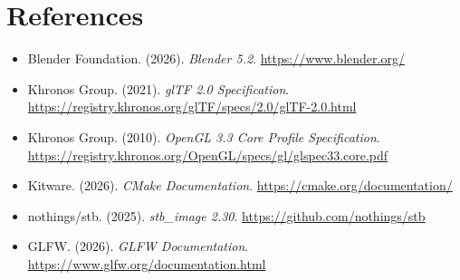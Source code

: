 \documentclass[letter,11pt]{article}
\begin{document}
	\section{References}
	\begin{itemize}[leftmargin=*]
		\item Blender Foundation. (2026). \textit{Blender 5.2}. \url{https://www.blender.org/}
		\item Khronos Group. (2021). \textit{glTF 2.0 Specification}. \url{https://registry.khronos.org/glTF/specs/2.0/glTF-2.0.html}
		\item Khronos Group. (2010). \textit{OpenGL 3.3 Core Profile Specification}. \url{https://registry.khronos.org/OpenGL/specs/gl/glspec33.core.pdf}
		\item Kitware. (2026). \textit{CMake Documentation}. \url{https://cmake.org/documentation/}
		\item nothings/stb. (2025). \textit{stb\_image 2.30}. \url{https://github.com/nothings/stb}
		\item GLFW. (2026). \textit{GLFW Documentation}. \url{https://www.glfw.org/documentation.html}
	\end{itemize}
\end{document}
